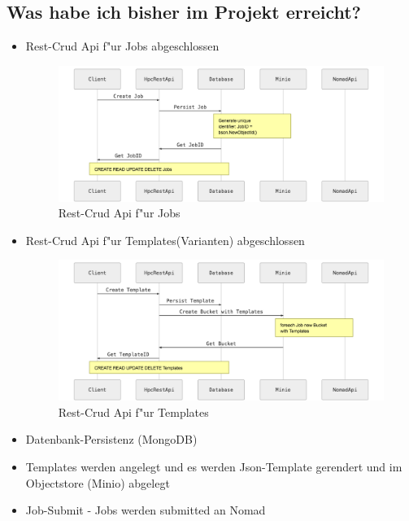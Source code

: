 \documentclass[12pt]{article}
\begin{document}
\subsection{Was habe ich bisher im Projekt erreicht?}
\begin{itemize}
	\item Rest-Crud Api f"ur Jobs abgeschlossen
	\begin{figure}[!htp]
		\includegraphics[width=1\textwidth]{./img/01_create-job.png}
		\captionsetup{name=Abb.,font=footnotesize}
		\caption{Rest-Crud Api f"ur Jobs}
	\end{figure}
	\item Rest-Crud Api f"ur Templates(Varianten) abgeschlossen
	\begin{figure}[!htp]
		\includegraphics[width=1\textwidth]{./img/02_create-template.png}
		\captionsetup{name=Abb.,font=footnotesize}
		\caption{Rest-Crud Api f"ur Templates}
	\end{figure}
	\item Datenbank-Persistenz (MongoDB)
	\item Templates werden angelegt und es werden Json-Template gerendert und im Objectstore (Minio) abgelegt
	\item Job-Submit - Jobs werden submitted an Nomad

\end{itemize}
\smallbreak
\end{document}
